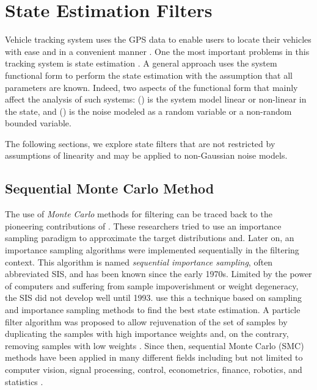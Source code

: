 \section{State Estimation Filters}\label{sectionFiltering}


Vehicle tracking system uses the GPS data to enable users to locate their vehicles with ease and in a convenient manner \citep{pham2013development}. One the most important problems in this tracking system is state estimation \citep{toloei2014state}. A general approach uses the system functional form to perform the state estimation with the assumption that all parameters are known. Indeed, two aspects of the functional form that mainly affect the analysis of such systems: () is the system model linear or non-linear in the state, and () is the noise modeled as a random variable or a non-random bounded variable.

The following sections, we explore state filters that are not restricted by assumptions of linearity and may be applied to non-Gaussian noise models.  


\subsection{Sequential Monte Carlo Method}

The use of \textit{Monte Carlo} methods for filtering can be traced back to the pioneering contributions of \citep{handschin1969monte, handschin1970monte}. These researchers tried to use an importance sampling paradigm to approximate the target distributions and. Later on, an importance sampling algorithms were implemented sequentially in the filtering context. This algorithm is named \textit{sequential importance sampling}, often abbreviated SIS, and has been known since the early 1970s. Limited by the power of computers and suffering from sample impoverishment or weight degeneracy, the SIS did not develop well until 1993. \cite{gordon1993novel} use this a technique based on sampling and importance sampling methods to find the best state estimation. A particle filter algorithm was proposed to allow rejuvenation of the set of samples by duplicating the samples with high importance weights and, on the contrary, removing samples with low weights \citep{cappe2009inference}. Since then, sequential Monte Carlo (SMC) methods have been applied in many different fields including but not limited to computer vision, signal processing, control, econometrics, finance, robotics, and statistics \citep{smcmip2011, ristic2004beyond}.

